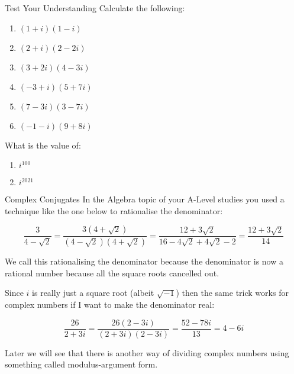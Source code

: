\documentclass{beamer}
\begin{document}
	\begin{frame}[shrink=15]{Test Your Understanding}
	    Calculate the following:
	    \begin{enumerate}[label={(\alph*)}]
	        \item $(1+i)(1-i)$ 
	        \item $(2+i)(2-2i)$ 
	        \item $(3+2i)(4-3i)$ 
	        \item $(-3+i)(5+7i)$ 
	        \item $(7-3i)(3-7i)$ 
	        \item $(-1-i)(9+8i)$ 
	    \end{enumerate}
	    
	    What is the value of:
	    \begin{enumerate}[label={(\alph*)}]
	        \item $i^{100}$ 
	        \item $i^{2021}$ 
	   \end{enumerate}
	\end{frame}

	\begin{frame}[shrink=15]{Complex Conjugates}
	    In the Algebra topic of your A-Level studies you used a technique like the one below to rationalise the denominator:
	    
        \begin{equation*}
            \frac{3}{4-\sqrt{2}} = \frac{3(4+\sqrt{2})}{(4-\sqrt{2})(4+\sqrt{2})} = \frac{12+3\sqrt{2}}{16-4\sqrt{2}+4\sqrt{2}-2} = \frac{12+3\sqrt{2}}{14}
        \end{equation*}
        
        \vspace{\baselineskip}
        
        We call this rationalising the denominator because the denominator is now a rational number because all the square roots cancelled out.
        
        Since $i$ is really just a square root (albeit $\sqrt{-1}$) then the same trick works for complex numbers if I want to make the denominator real:
        
        \begin{equation*}
            \frac{26}{2+3i} = \frac{26(2-3i)}{(2+3i)(2-3i)} = \frac{52-78i}{13} = 4-6i
        \end{equation*}
        
        \vspace{\baselineskip}
        
        \alert<1>{Later we will see that there is another way of dividing complex numbers using something called modulus-argument form.}
	\end{frame}
	
\end{document}
